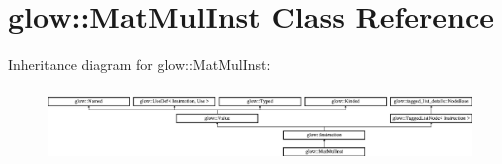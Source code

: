 \hypertarget{classglow_1_1_mat_mul_inst}{}\section{glow\+:\+:Mat\+Mul\+Inst Class Reference}
\label{classglow_1_1_mat_mul_inst}
Inheritance diagram for glow\+:\+:Mat\+Mul\+Inst\+:\begin{figure}[H]
\begin{center}
\leavevmode
\includegraphics[height=1.991111cm]{classglow_1_1_mat_mul_inst}
\end{center}
\end{figure}
